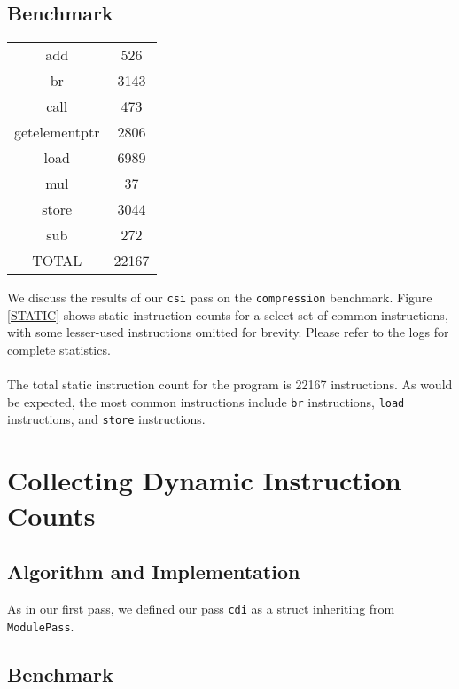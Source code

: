 \documentclass[12pt]{article}
\begin{document}
\subsection{Benchmark}

\begin{figure*}[!t]
\begin{center}
\begin{tabular} { |c|c| }
\hline
	add & 526 \\
	br & 3143 \\
	call & 473 \\
	getelementptr & 2806 \\
	load & 6989 \\
	mul & 37 \\
	store & 3044 \\
	sub & 272 \\
	TOTAL & 22167 \\
\hline
\end{tabular}
\caption{Selected static instruction counts from the {\tt compression} benchmark}
\label{STATIC}
\end{center}
\end{figure*}

We discuss the results of our {\tt csi} pass on the {\tt compression} benchmark. Figure \ref{STATIC} shows static instruction counts for a select set of common instructions, with some lesser-used instructions omitted for brevity. Please refer to the logs for complete statistics.
\\\\
The total static instruction count for the program is 22167 instructions. As would be expected, the most common instructions include {\tt br} instructions, {\tt load} instructions, and {\tt store} instructions. 


\section{Collecting Dynamic Instruction Counts}

\subsection{Algorithm and Implementation}

As in our first pass, we defined our pass {\tt cdi} as a struct inheriting from {\tt ModulePass}. 

\subsection{Benchmark}
\end{document}
